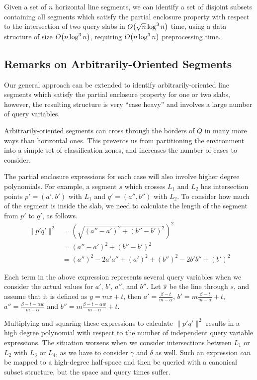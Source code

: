 \begin{theorem}
\label{th:slabs:two}
Given a set of $n$ horizontal line segments, we can identify a set of disjoint 
subsets containing all segments which satisfy the partial enclosure property 
with respect to the intersection of two query slabs in 
$O\!\left(\sqrt{n}\log^3{n}\right)$ time, using a data structure of size 
$O\!\left(n\log^3{n}\right)$, requiring $O\!\left(n\log^3{n}\right)$ preprocessing time.
\end{theorem}


\subsection{Remarks on Arbitrarily-Oriented Segments}
\label{:slabs:remarks}

Our general approach can be extended to identify arbitrarily-oriented line 
segments which satisfy the partial enclosure property for one or two slabs, 
however, the resulting structure is very ``case heavy'' and involves a large 
number of query variables.

Arbitrarily-oriented segments can cross through the borders of $Q$ in many more 
ways than horizontal ones.
This prevents us from partitioning the environment into a simple set of 
classification zones, and increases the number of cases to consider.

The partial enclosure expressions for each case will also involve higher degree 
polynomials.
For example, a segment $s$ which crosses $L_1$ and $L_2$ has intersection points 
$p' = (a', b')$ with $L_1$ and $q' = (a'', b'')$ with $L_2$.  
To consider how much of the segment is inside the slab, we need to calculate the 
length of the segment from $p'$ to $q'$, as follows.
\[
\begin{split}
\|p'q'\|^2 
&= \left( \sqrt{(a'' - a')^2 + (b'' - b')^2} \right)^2 \\
%
&= (a'' - a')^2 + (b'' - b')^2 \\
%
&= (a'')^2 - 2a'a'' + (a')^2 + (b'')^2 - 2b'b'' + (b')^2
\end{split}
\]

Each term in the above expression represents several query variables when we 
consider the actual values for $a'$, $b'$, $a''$, and $b''$.  
Let $\overline{s}$ be the line through $s$, and assume that it is defined as $y = 
mx + t$, then
$a'  = \frac{\beta - t}{m - \alpha}$, 
$b'  = m \frac{\beta - t}{m - \alpha} + t$, 
$a'' = \frac{\beta - t - \alpha w}{m - \alpha}$ and  
$b'' = m \frac{\beta - t - \alpha w}{m - \alpha} + t$.

Multiplying and squaring these expressions to calculate $\|p'q'\|^2$ results in 
a high degree polynomial with respect to the number of independent query 
variable expressions.
The situation worsens when we consider intersections between $L_1$ or $L_2$ with 
$L_3$ or $L_4$, as we have to consider $\gamma$ and $\delta$ as well.
Such an expression \emph{can} be mapped to a high-degree half-space and then be 
queried with a canonical subset structure, but the space and query times suffer.

